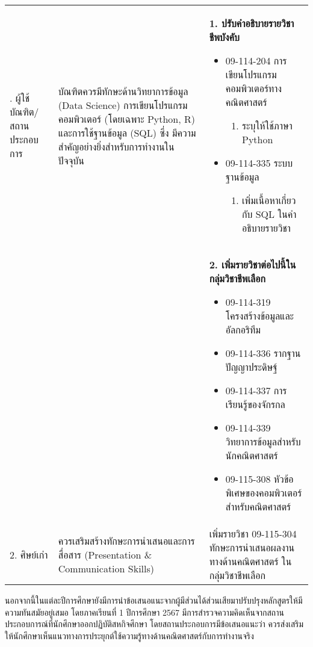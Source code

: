 \begin{longtable}{|>{\raggedright}p{}| >{\raggedright}p{} | >{\raggedright\arraybackslash}p{}|}
\hline
\endfoot
1. ผู้ใช้บัณฑิต/สถานประกอบการ & บัณฑิตควรมีทักษะด้านวิทยาการข้อมูล (Data Science) การเขียนโปรแกรมคอมพิวเตอร์ (โดยเฉพาะ Python, R) และการใช้ฐานข้อมูล (SQL) ซึ่ง มีความสำคัญอย่างยิ่งสำหรับการทำงานในปัจจุบัน & 
\textbf{1. ปรับคำอธิบายรายวิชาชีพบังคับ}
\begin{itemize}
	\item 09-114-204 การเขียนโปรแกรมคอมพิวเตอร์ทางคณิตศาสตร์ 
	\begin{enumerate}[label={-}]
		\item ระบุให้ใช้ภาษา Python
	\end{enumerate}
	\item 09-114-335 ระบบฐานข้อมูล
	\begin{enumerate}[label={-}]
		\item เพิ่มเนื้อหาเกี่ยวกับ SQL ในคำอธิบายรายวิชา 
	\end{enumerate}
\end{itemize}\\
&&
\textbf{2. เพิ่มรายวิชาต่อไปนี้ในกลุ่มวิชาชีพเลือก }
\begin{itemize}
	\item 09-114-319 โครงสร้างข้อมูลและอัลกอริทึม
	\item 09-114-336 รากฐานปัญญาประดิษฐ์
	\item 09-114-337 การเรียนรู้ของจักรกล
	\item 09-114-339 วิทยาการข้อมูลสำหรับนักคณิตศาสตร์
	\item 09-115-308 หัวข้อพิเศษของคอมพิวเตอร์สำหรับคณิตศาสตร์
\end{itemize}
\\ \hline
2. ศิษย์เก่า & ควรเสริมสร้างทักษะการนำเสนอและการสื่อสาร (Presentation \& Communication Skills) & เพิ่มรายวิชา 09-115-304 ทักษะการนำเสนอผลงานทางด้านคณิตศาสตร์ ในกลุ่มวิชาชีพเลือก \\ 
\end{longtable}


นอกจากนี้ในแต่ละปีการศึกษายังมีการนำข้อเสนอแนะจากผู้มีส่วนได้ส่วนเสียมาปรับปรุงหลักสูตรให้มีความทันสมัยอยู่เสมอ โดยภาคเรียนที่ 1 ปีการศึกษา 2567 มีการสำรวจความคิดเห็นจากสถานประกอบการณ์ที่นักศึกษาออกปฏิบัติสหกิจศึกษา โดยสถานประกอบการมีข้อเสนอแนะว่า  ควรส่งเสริมให้นักศึกษาเห็นแนวทางการประยุกต์ใช้ความรู้ทางด้านคณิตศาสตร์กับการทำงานจริง 

